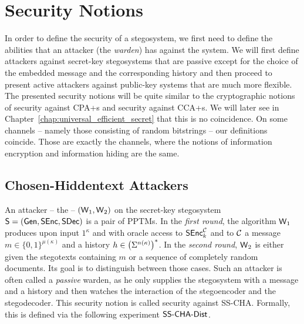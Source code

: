 \section{Security Notions}
In order to define the security of a stegosystem, we first need to
define the abilities that an attacker (the \emph{warden}) has against
the system. We will first define attackers against secret-key
stegosystems that are passive except for the choice of the embedded
message and the corresponding history and then proceed to  present
active attackers against public-key systems that are much more
flexible. The presented security notions will be quite similar to the
cryptographic notions of security against \aclp{CPA+} and security
against \aclp{CCA+}. We will later see in
Chapter~\ref{chap:universal_efficient_secret} that this is no
coincidence. On some channels -- namely those consisting of random
bitstrings -- our definitions coincide. Those are exactly the channels,
where the notions of information encryption and information hiding are
the same.


\subsection*{Chosen-Hiddentext Attackers}
An attacker -- the  -- $(\operatorname{\mathsf{W}}_{1},\operatorname{\mathsf{W}}_{2})$ on the
secret-key stegosystem $\operatorname{\mathsf{S}}=(\operatorname{\mathsf{Gen}},\operatorname{\mathsf{SEnc}},\operatorname{\mathsf{SDec}})$ is a pair of
\acp{PPTM}. In the \emph{first round}, the algorithm $\operatorname{\mathsf{W}}_{1}$
produces upon input $1^{\kappa}$ and with oracle access to
$\operatorname{\mathsf{SEnc}}^{\mathcal{C}}_{k}$ and to $\mathcal{C}$ a message
$m\in \{0,1\}^{\mu(\kappa)}$ and a history $h\in \left(\Sigma^{n(\kappa)}\right)^{*}$. In the
\emph{second round}, $\operatorname{\mathsf{W}}_{2}$ is either given the stegotexts
containing $m$ or a sequence of completely random documents. Its goal is
to distinguish between those cases. Such an attacker is often called a
\emph{passive} warden, as he only supplies the stegosystem with a
message and a history and then watches the interaction of the
stegoencoder and the stegodecoder. 
This security notion is called
security against \ac{SS-CHA}. Formally, this is defined via the following
experiment $\SSCHA-Dist$.


